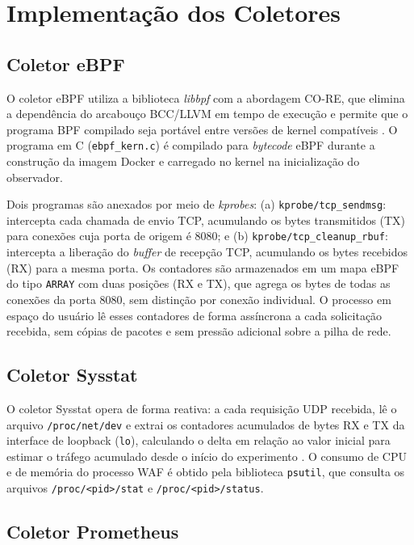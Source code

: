 \section{Implementação dos Coletores}

\subsection{Coletor eBPF}

O coletor eBPF utiliza a biblioteca \textit{libbpf} com a abordagem CO-RE, que elimina a dependência do arcabouço BCC/LLVM em tempo de execução e permite que o programa BPF compilado seja portável entre versões de kernel compatíveis \cite{gregg_bpf_2019}. O programa em C (\texttt{ebpf\_kern.c}) é compilado para \textit{bytecode} eBPF durante a construção da imagem Docker e carregado no kernel na inicialização do observador.

Dois programas são anexados por meio de \textit{kprobes}: (a) \texttt{kprobe/tcp\_sendmsg}: intercepta cada chamada de envio TCP, acumulando os bytes transmitidos (TX) para conexões cuja porta de origem é 8080; e (b) \texttt{kprobe/tcp\_cleanup\_rbuf}: intercepta a liberação do \textit{buffer} de recepção TCP, acumulando os bytes recebidos (RX) para a mesma porta. Os contadores são armazenados em um mapa eBPF do tipo \texttt{ARRAY} com duas posições (RX e TX), que agrega os bytes de todas as conexões da porta 8080, sem distinção por conexão individual. O processo em espaço do usuário lê esses contadores de forma assíncrona a cada solicitação recebida, sem cópias de pacotes e sem pressão adicional sobre a pilha de rede.

\subsection{Coletor Sysstat}

O coletor Sysstat opera de forma reativa: a cada requisição UDP recebida, lê o arquivo \texttt{/proc/net/dev} e extrai os contadores acumulados de bytes RX e TX da interface de loopback (\texttt{lo}), calculando o delta em relação ao valor inicial para estimar o tráfego acumulado desde o início do experimento \cite{godard2024sysstat}. O consumo de CPU e de memória do processo WAF é obtido pela biblioteca \texttt{psutil}, que consulta os arquivos \texttt{/proc/<pid>/stat} e \texttt{/proc/<pid>/status}.

\subsection{Coletor Prometheus}

